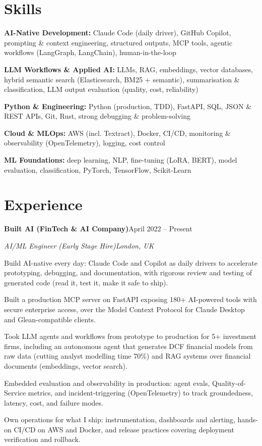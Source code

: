 \documentclass[10pt,a4paper]{article}
\newcommand{\entry}[4]{%
  {\color{company}\bfseries #1}\hfill {\color{muted}#2}\par
  \vspace{1pt}
  {\itshape #3}\hfill {\color{muted}\itshape #4}\par
  \vspace{3pt}%
}
\begin{document}
\section{Skills}
\begin{tight}
  \item[\textcolor{accent}{\small$\bullet$}] \textbf{AI-Native Development:} Claude Code (daily driver), GitHub Copilot, prompting \& context engineering, structured outputs, MCP tools, agentic workflows (LangGraph, LangChain), human-in-the-loop
  \item[\textcolor{accent}{\small$\bullet$}] \textbf{LLM Workflows \& Applied AI:} LLMs, RAG, embeddings, vector databases, hybrid semantic search (Elasticsearch, BM25 + semantic), summarisation \& classification, LLM output evaluation (quality, cost, reliability)
  \item[\textcolor{accent}{\small$\bullet$}] \textbf{Python \& Engineering:} Python (production, TDD), FastAPI, SQL, JSON \& REST APIs, Git, Rust, strong debugging \& problem-solving
  \item[\textcolor{accent}{\small$\bullet$}] \textbf{Cloud \& MLOps:} AWS (incl. Textract), Docker, CI/CD, monitoring \& observability (OpenTelemetry), logging, cost control
  \item[\textcolor{accent}{\small$\bullet$}] \textbf{ML Foundations:} deep learning, NLP, fine-tuning (LoRA, BERT), model evaluation, classification, PyTorch, TensorFlow, Scikit-Learn
\end{tight}

\section{Experience}
\entry{Built AI (FinTech \& AI Company)}{April 2022 -- Present}{AI/ML Engineer (Early Stage Hire)}{London, UK}
\begin{tight}
  \item Build AI-native every day: Claude Code and Copilot as daily drivers to accelerate prototyping, debugging, and documentation, with rigorous review and testing of generated code (read it, test it, make it safe to ship).
  \item Built a production MCP server on FastAPI exposing 180+ AI-powered tools with secure enterprise access, over the Model Context Protocol for Claude Desktop and Glean-compatible clients.
  \item Took LLM agents and workflows from prototype to production for 5+ investment firms, including an autonomous agent that generates DCF financial models from raw data (cutting analyst modelling time 70\%) and RAG systems over financial documents (embeddings, vector search).
  \item Embedded evaluation and observability in production: agent evals, Quality-of-Service metrics, and incident-triggering (OpenTelemetry) to track groundedness, latency, cost, and failure modes.
  \item Own operations for what I ship: instrumentation, dashboards and alerting, hands-on CI/CD on AWS and Docker, and release practices covering deployment verification and rollback.
\end{tight}
\end{document}
